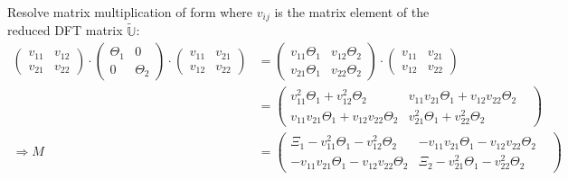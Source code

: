 \documentclass[
	english,
	a4paper,
	fontsize=10pt,
	parskip=half,
	titlepage=true,
	DIV=12,
	final
]{scrreprt}
\newcommand*{\Thus}{\ensuremath{\Rightarrow}\xspace}
\begin{document}
Resolve matrix multiplication of form where $v_{ij}$ is the matrix element of the reduced DFT matrix
$\tilde{\mathbb{U}}$:
\begin{align*}
	\begin{pmatrix}
		v_{11} & v_{12} \\
		v_{21} & v_{22}
	\end{pmatrix}
	\cdot
	\begin{pmatrix}
		\Theta_1 &        0 \\
		       0 & \Theta_2
	\end{pmatrix}
	\cdot
	\begin{pmatrix}
		v_{11} & v_{21} \\
		v_{12} & v_{22}
	\end{pmatrix}
&=
	\begin{pmatrix}
		v_{11} \Theta_1 & v_{12} \Theta_2 \\
		v_{21} \Theta_1 & v_{22} \Theta_2
	\end{pmatrix}
	\cdot
	\begin{pmatrix}
		v_{11} & v_{21} \\
		v_{12} & v_{22}
	\end{pmatrix}
\\
&=
	\begin{pmatrix}
		v_{11}^2      \Theta_1   +   v_{12}^2      \Theta_2 & 
		v_{11} v_{21} \Theta_1   +   v_{12} v_{22} \Theta_2
	\\
		v_{11} v_{21} \Theta_1   +   v_{12} v_{22} \Theta_2 &
		v_{21}^2      \Theta_1   +   v_{22}^2      \Theta_2 & 
	\end{pmatrix}
\\
\Thus
	M
&=
	\begin{pmatrix}
		\Xi_1 - v_{11}^2      \Theta_1   -   v_{12}^2      \Theta_2 & 
		      - v_{11} v_{21} \Theta_1   -   v_{12} v_{22} \Theta_2
	\\
		      - v_{11} v_{21} \Theta_1   -   v_{12} v_{22} \Theta_2 &
		\Xi_2 - v_{21}^2      \Theta_1   -   v_{22}^2      \Theta_2 & 
	\end{pmatrix}
\end{align*}
\end{document}
